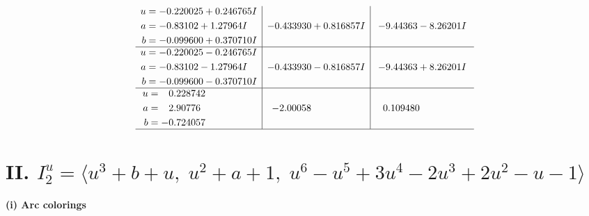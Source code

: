 \documentclass[1p]{elsarticle_modified}
\theoremstyle{definition}
\begin{document}
$$\begin{array}{c|c|c}
\begin{aligned}
u &= -0.220025 + 0.246765 I \\
a &= -0.83102 + 1.27964 I \\
b &= -0.099600 + 0.370710 I\end{aligned}
 & -0.433930 + 0.816857 I & -9.44363 - 8.26201 I \\ \hline\begin{aligned}
u &= -0.220025 - 0.246765 I \\
a &= -0.83102 - 1.27964 I \\
b &= -0.099600 - 0.370710 I\end{aligned}
 & -0.433930 - 0.816857 I & -9.44363 + 8.26201 I \\ \hline\begin{aligned}
u &= \phantom{-}0.228742\phantom{ +0.000000I} \\
a &= \phantom{-}2.90776\phantom{ +0.000000I} \\
b &= -0.724057\phantom{ +0.000000I}\end{aligned}
 & -2.00058\phantom{ +0.000000I} & \phantom{-}0.109480\phantom{ +0.000000I}\\
 \hline 
 \end{array}$$\newpage\newpage\renewcommand{\arraystretch}{1}
\centering \section*{II. $I^u_{2}= \langle u^3+b+u,\;u^2+a+1,\;u^6- u^5+3 u^4-2 u^3+2 u^2- u-1 \rangle$}
\flushleft \textbf{(i) Arc colorings}\\
\end{document}
